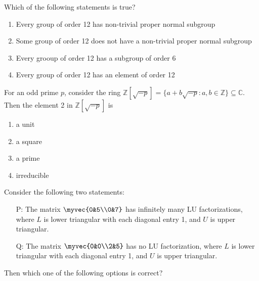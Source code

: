 \iffalse
\title{Assignment8}
\author{ee24btech11064}
\chapter{2018}
\section{ma}
\fi

\item Which of the following statements is true?
\begin{enumerate}
    \item Every group of order 12 has non-trivial proper normal subgroup
    \item Some group of order 12 does not have a non-trivial proper normal subgroup
    \item Every grooup of order 12 has a subgroup of order 6
    \item Every group of order 12 has an element of order 12 
\end{enumerate}

\vspace{0.5cm}
\item For an odd prime $p$, consider the ring $\mathbb{Z}[\sqrt{-p}]=\{a+b\sqrt{-p}:a,b\in \mathbb{Z}\}\subseteq \mathbb{C}$. Then the element 2 in $\mathbb{Z}[\sqrt{-p}]$ is 
\begin{multicols}{2}
    \begin{enumerate}
        \item a unit
        \item a square
        \item a prime 
        \item irreducible
    \end{enumerate}
\end{multicols}

\vspace{0.5cm}
\item Consider the following two statements:
\begin{itemize}
    \item[P:] The matrix 
    $\myvec{0&5\\0&7}$
    has infinitely many LU factorizations, where \( L \) is lower triangular with each diagonal entry 1, and \( U \) is upper triangular.
    
    \item[Q:] The matrix 
    $\myvec{0&0\\2&5}$
    has no LU factorization, where \( L \) is lower triangular with each diagonal entry 1, and \( U \) is upper triangular.
\end{itemize}
Then which one of the following options is correct?

